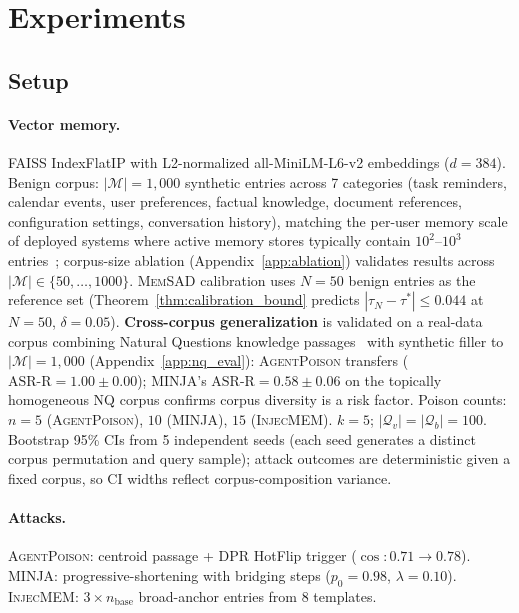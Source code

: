 \documentclass{article}
\theoremstyle{definition}
\newcommand{\asrr}{\text{ASR-R}}
\newcommand{\cM}{\mathcal{M}}
\newcommand{\cQ}{\mathcal{Q}}
\newcommand{\memsad}{\textnormal{\textsc{MemSAD}}}
\newcommand{\agentpoison}{\textsc{AgentPoison}}
\newcommand{\minja}{\textsc{MINJA}}
\newcommand{\injecmem}{\textsc{InjecMEM}}
\DeclareMathOperator{\cosim}{cos}
\begin{document}
\section{Experiments}
\label{sec:experiments}

\subsection{Setup}

\paragraph{Vector memory.}
FAISS IndexFlatIP with L2-normalized all-MiniLM-L6-v2 embeddings ($d = 384$).
Benign corpus: $|\cM| = 1{,}000$ synthetic entries across 7 categories (task reminders, calendar events, user preferences, factual knowledge, document references, configuration settings, conversation history), matching the per-user memory scale of deployed systems where active memory stores typically contain $10^2$--$10^3$ entries~\citep{chen2024agentpoison,dong2025minja}; corpus-size ablation (Appendix~\ref{app:ablation}) validates results across $|\cM| \in \{50, \ldots, 1000\}$. \memsad{} calibration uses $N = 50$ benign entries as the reference set (Theorem~\ref{thm:calibration_bound} predicts $|\tau_N - \tau^*| \leq 0.044$ at $N=50$, $\delta=0.05$). \textbf{Cross-corpus generalization} is validated on a real-data corpus combining Natural Questions knowledge passages~\citep{kwiatkowski2019natural} with synthetic filler to $|\cM|=1{,}000$ (Appendix~\ref{app:nq_eval}): \agentpoison{} transfers ($\asrr = 1.00 \pm 0.00$); \minja{}'s $\asrr = 0.58 \pm 0.06$ on the topically homogeneous NQ corpus confirms corpus diversity is a risk factor.
Poison counts: $n = 5$ (\agentpoison{}), $10$ (\minja{}), $15$ (\injecmem{}).
$k = 5$; $|\cQ_v| = |\cQ_b| = 100$.
Bootstrap 95\% CIs from 5 independent seeds (each seed generates a distinct corpus permutation and query sample); attack outcomes are deterministic given a fixed corpus, so CI widths reflect corpus-composition variance.

\paragraph{Attacks.}
\agentpoison{}: centroid passage + DPR HotFlip trigger ($\cosim: 0.71 \to 0.78$).
\minja{}: progressive-shortening with bridging steps ($p_0 = 0.98$, $\lambda = 0.10$).
\injecmem{}: $3 \times n_{\text{base}}$ broad-anchor entries from 8 templates.
\end{document}
